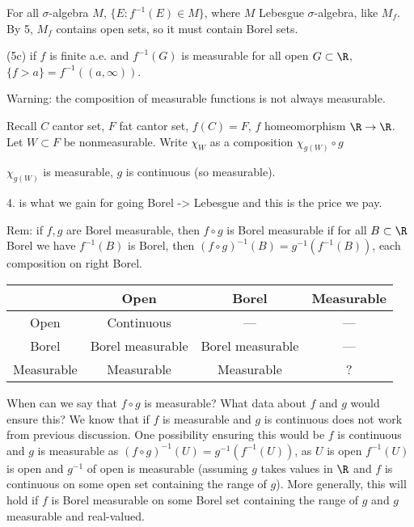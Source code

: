 For all $\sigma$-algebra $M$, $\{E \colon f^{-1}(E) \in M\}$, where $M$ Lebesgue $\sigma$-algebra, like $M_f$. By 5, $M_f$ contains open sets, so it must contain Borel sets.

(5c) if $f$ is finite a.e. and $f^{-1}(G)$ is measurable for all open $G \subset \R$, $\{f>a\}= f^{-1}((a,\infty))$.


Warning: the composition of measurable functions is not always measurable. 


Recall $C$ cantor set, $F$ fat cantor set, $f(C)=F$, $f$ homeomorphism $\R \to \R$. Let $W \subset F$ be nonmeasurable. Write $\chi_W$ as a composition $\chi_{g(W)} \circ g$


$\chi_{g(W)}$ is measurable, $g$ is continuous (so measurable).

4. is what we gain for going Borel -> Lebesgue and this is the price we pay.

Rem: if $f,g$ are Borel measurable, then $f \circ g$ is Borel measurable if for all $B \subset \R$ Borel we have $f^{-1}(B)$ is Borel, then $(f \circ g)^{-1}(B)= g^{-1}(f^{-1}(B))$, each composition on right Borel. 







	\begin{table}[h]
	\centering 
	\begin{tabular}{|c|c|c|c|} \hline
	\diagbox{is}{(*)} & Open & Borel & Measurable \\ \hline
	Open & Continuous & --- & --- \\ \hline
	Borel & Borel measurable & Borel measurable & --- \\ \hline
	Measurable & Measurable & Measurable & ? \\ \hline
	\end{tabular}
	\end{table}



When can we say that $f \circ g$ is measurable? What data about $f$ and $g$ would ensure this? 
We know that if $f$ is measurable and $g$ is continuous does not work from previous discussion. One possibility ensuring this would be $f$ is continuous and $g$ is measurable as $(f \circ g)^{-1}(U)= g^{-1}(f^{-1}(U))$, as $U$ is open $f^{-1}(U)$ is open and $g^{-1}$ of open is measurable (assuming $g$ takes values in $\R$ and $f$ is continuous on some open set containing the range of $g$). More generally, this will hold if $f$ is Borel measurable on some Borel set containing the range of $g$ and $g$ measurable and real-valued. 


